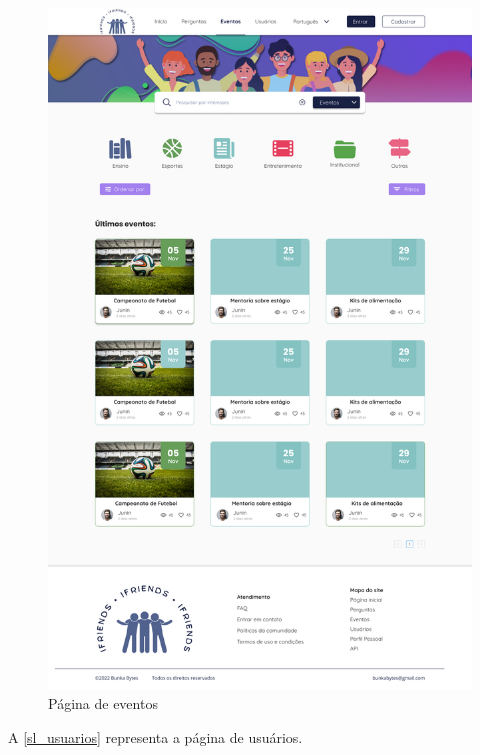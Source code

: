 \begin{figure}[htb]
\centering
\caption{\label{sl_eventos} Página de eventos}
\includegraphics[width=1\textwidth]{anexos/Imagens_Prototipo/sem_login/eventos.png}
\end{figure}
\FloatBarrier

A \autoref{sl_usuarios} representa a página de usuários.

